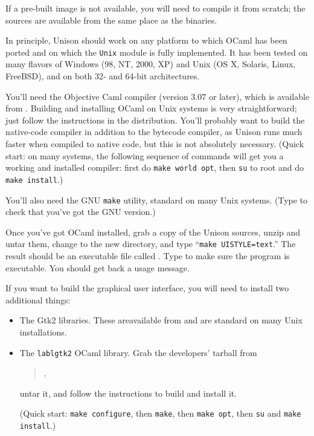 \documentclass{article}
\begin{document}

If a pre-built image is not available, you will need to compile it from
scratch; the sources are available from the same place as the binaries.

In principle, Unison should work on any platform to which OCaml has been
ported and on which the \verb|Unix| module is fully implemented.  It has
been tested on many flavors of Windows (98, NT, 2000, XP) and Unix (OS X,
Solaris, Linux, FreeBSD), and on both 32- and 64-bit architectures.



You'll need the Objective Caml compiler (version 3.07 or later), which is
available from .  Building and installing OCaml
on Unix systems is very straightforward; just follow the instructions in the
distribution.  You'll probably want to build the native-code compiler in
addition to the bytecode compiler, as Unison runs much faster when compiled
to native code, but this is not absolutely necessary.
%
(Quick start: on many systems, the following sequence of commands will
get you a working and installed compiler: first do {\tt make world opt},
then {\tt su} to root and do {\tt make install}.)

You'll also need the GNU {\tt make} utility, standard on many Unix
systems. (Type  to check that you've got the
GNU version.)

Once you've got OCaml installed, grab a copy of the Unison sources,
unzip and untar them, change to the new  directory, and
type ``{\tt make UISTYLE=text}.''
The result should be an executable file called .
Type  to make sure the program is executable.  You
should get back a usage message.

If you want to build the graphical user interface, you will need to install
two additional things:
\begin{itemize}
\item The Gtk2 libraries.  These areavailable from
   and are standard on many Unix installations.   
  
\item The {\tt lablgtk2} OCaml library.  Grab the
  developers' tarball from
  \begin{quote}
  ,
  \end{quote}
  untar it, and follow the instructions to build and install it.

  (Quick start: {\tt make configure}, then {\tt make}, then {\tt make
  opt}, then {\tt su} and {\tt make install}.)
\end{itemize}
\end{document}
